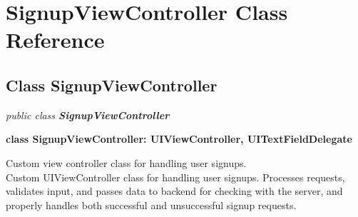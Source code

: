 
\hypertarget{class_SignupViewController.iOS}{\section{SignupViewController Class Reference}
\label{class_SignupViewController.iOS}
}

\subsection*{Class SignupViewController}

\textit{public class \textbf{ SignupViewController}}

\tab \textbf{class SignupViewController: UIViewController, UITextFieldDelegate}

Custom view controller class for handling user signups.\\

Custom UIViewController class for handling user signups. Processes requests, validates input, and passes data to backend for checking with the server, and properly handles both successful and unsuccessful signup requests.\\


